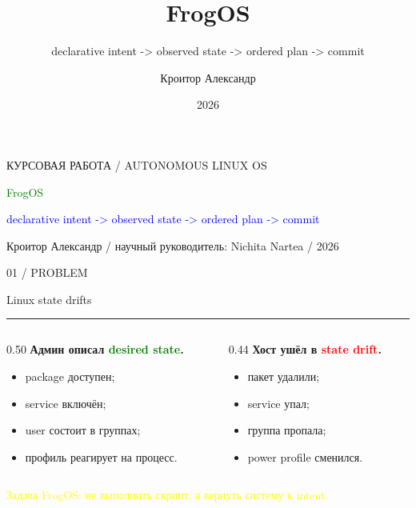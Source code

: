 \documentclass[aspectratio=169,10pt]{beamer}
\title{FrogOS}
\subtitle{declarative intent -> observed state -> ordered plan -> commit}
\author{Кроитор Александр}
\institute{Научный руководитель: Nichita Nartea}
\date{2026}
\newcommand{\kicker}[1]{\textcolor{Muted}{\footnotesize\MakeUppercase{#1}}}
\newcommand{\slidehead}[2]{
  \vspace*{0.2cm}
  \kicker{#1}\par
  \vspace{0.1cm}
  {\usebeamerfont{frametitle}\textcolor{Text}{#2}}\par
  \vspace{0.18cm}
  {\color{Muted}\rule{\linewidth}{0.4pt}}
  \vspace{0.25cm}
}
\newcommand{\leadclaim}[1]{{\fontsize{18}{23}\selectfont\bfseries #1}}
\newcommand{\muted}[1]{\textcolor{Muted}{#1}}
\newcommand{\green}[1]{\textcolor{Green}{#1}}
\newcommand{\yellow}[1]{\textcolor{Yellow}{#1}}
\newcommand{\red}[1]{\textcolor{Red}{#1}}
\begin{document}
\begin{frame}
  \vspace*{0.7cm}
  \kicker{курсовая работа / autonomous linux OS}
  \vspace{0.35cm}

  {\textcolor{Green}{FrogOS}}\par
  \vspace{0.18cm}
  {\textcolor{Blue}{declarative intent -> observed state -> ordered plan -> commit}}\par

  \vfill

  \vfill
  \muted{Кроитор Александр / научный руководитель: Nichita Nartea / 2026}
\end{frame}

\begin{frame}{}
  \slidehead{01 / problem}{Linux state drifts}

  \begin{columns}[T,totalwidth=\textwidth]
    \begin{column}{0.50\textwidth}
      \leadclaim{Админ описал \green{desired state}.}
      \vspace{0.45cm}

      \begin{itemize}
        \item package доступен;
        \item service включён;
        \item user состоит в группах;
        \item профиль реагирует на процесс.
      \end{itemize}
    \end{column}
    \begin{column}{0.44\textwidth}
      \leadclaim{Хост ушёл в \red{state drift}.}
      \vspace{0.45cm}

      \begin{itemize}
        \item пакет удалили;
        \item service упал;
        \item группа пропала;
        \item power profile сменился.
      \end{itemize}
    \end{column}
  \end{columns}

  \vfill
  {\large\yellow{Задача FrogOS: не выполнить скрипт, а вернуть систему к intent.}}
\end{frame}
\end{document}
